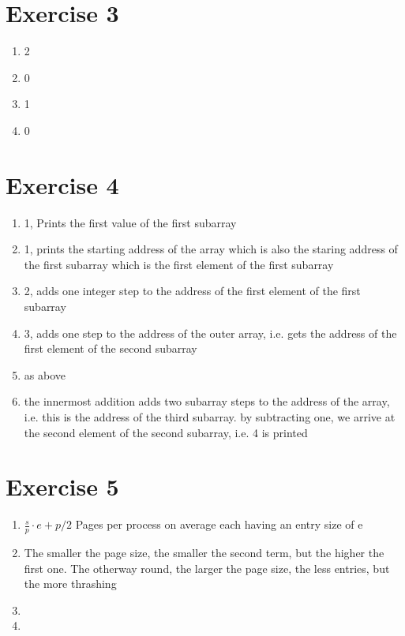 \documentclass[a4paper,10pt]{article}
\begin{document}
\section*{Exercise 3}
    \begin{enumerate}
        \item 2
        \item 0
        \item 1
        \item 0
    \end{enumerate}

\section*{Exercise 4}
    \begin{enumerate}
        \item 1, Prints the first value of the first subarray
        \item 1, prints the starting address of the array which is also the staring address of the first subarray which is the first element of the first subarray
        \item 2, adds one integer step to the address of the first element of the first subarray
        \item 3, adds one step to the address of the outer array, i.e. gets the address of the first element of the second subarray
        \item as above
        \item the innermost addition adds two subarray steps to the address of the array, i.e. this is the address of the third subarray. by subtracting one, we arrive at the second element of the second subarray, i.e. 4 is printed
    \end{enumerate}


\section*{Exercise 5}
    \begin{enumerate}
        \item $\frac{s}{p} \cdot e + p/2$ Pages per process on average each having an entry size of e 
        \item The smaller the page size, the smaller the second term, but the higher the first one. The otherway round, the larger the page size, the less entries, but the more thrashing
        \item 
        \item
    \end{enumerate}
\end{document}
